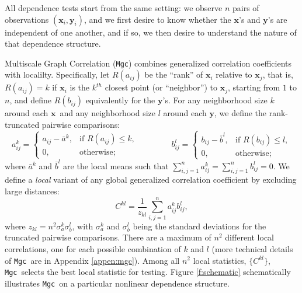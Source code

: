 \documentclass[11pt]{article}
\providecommand{\sct}[1]{{\sc \texttt{#1}}}
\providecommand{\mb}[1]{\boldsymbol{#1}}
\newcommand{\G}{C}
\newcommand{\Mgc}{\sct{Mgc}}
\newcommand{\mbx}{\ensuremath{\mb{x}}}
\newcommand{\mby}{\ensuremath{\mb{y}}}
\begin{document}
All dependence tests start from the same setting: we observe $n$ pairs of observations $(\mbx_i,\mby_i)$, and we first desire to know whether the \mbx's and \mby's are independent of one another, and if so, we then desire to understand the nature of that dependence structure.


Multiscale Graph Correlation (\Mgc) combines generalized correlation coefficients with localilty.
Specifically, let $R(a_{ij})$  be the ``rank'' of $\mbx_i$ relative to $\mbx_j$, that is, $R(a_{ij})=k$ if $\mbx_i$ is the $k^{th}$ closest point (or ``neighbor'') to $\mbx_j$, starting from $1$ to $n$, and  define $R(b_{ij})$ equivalently for the \mby's. For any neighborhood size $k$ around each \mbx~and any neighborhood size $l$ around each \mby, we define the rank-truncated pairwise comparisons:
\begin{equation}
\label{localCoef2}
    a_{ij}^k=
    \begin{cases}
      a_{ij}-\bar{a}^{k}, & \text{if } R(a_{ij}) \leq k, \\
      0, & \text{otherwise};
    \end{cases} \qquad \qquad
    b_{ij}^l=
    \begin{cases}
      b_{ij}-\bar{b}^{l}, & \text{if } R(b_{ij}) \leq l, \\
      0, & \text{otherwise};
    \end{cases}
\end{equation}
where $\bar{a}^{k}$ and $\bar{b}^{l}$ are the local means such that  $\sum_{i,j=1}^{n} a_{ij}^k = \sum_{i,j=1}^{n} b_{ij}^l=0$.  We define a \emph{local} variant of any global generalized correlation coefficient by  excluding large distances: %
\begin{equation}
\label{localCoef}
\G^{kl}=\dfrac{1}{z_{kl}} {\textstyle \sum_{i,j=1}^n a_{ij}^k b_{ij}^l},
\end{equation}
where $z_{kl}=n^2 \sigma_a^k \sigma_b^l$,  with $\sigma_a^k$ and $\sigma_b^{l}$ being the standard deviations for the truncated pairwise comparisons. There are a maximum of $n^2$ different local correlations, one for each possible combination of $k$ and $l$ (more technical details of \Mgc~are in Appendix \ref{appen:mgc}).
Among all $n^2$ local statistics, $\{\G^{kl}\}$, \Mgc~selects the best local statistic for testing. %
Figure \ref{f:schematic} schematically illustrates \Mgc~on a particular nonlinear dependence structure.
\end{document}
